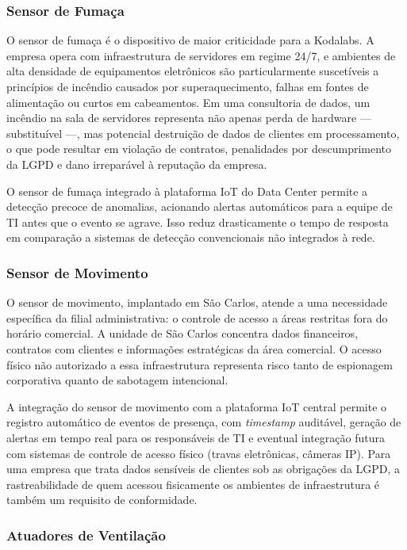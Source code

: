 \documentclass[12pt,a4paper]{article}
\begin{document}
\subsubsection{Sensor de Fumaça}

O sensor de fumaça é o dispositivo de maior criticidade para a Kodalabs. A empresa
opera com infraestrutura de servidores em regime 24/7, e ambientes de alta densidade
de equipamentos eletrônicos são particularmente suscetíveis a princípios de
incêndio causados por superaquecimento, falhas em fontes de alimentação ou curtos
em cabeamentos. Em uma consultoria de dados, um incêndio na sala de servidores
representa não apenas perda de hardware — substituível —, mas potencial destruição
de dados de clientes em processamento, o que pode resultar em violação de contratos,
penalidades por descumprimento da LGPD e dano irreparável à reputação da empresa.

O sensor de fumaça integrado à plataforma IoT do Data Center permite a detecção
precoce de anomalias, acionando alertas automáticos para a equipe de TI antes que
o evento se agrave. Isso reduz drasticamente o tempo de resposta em comparação a
sistemas de detecção convencionais não integrados à rede.

\subsubsection{Sensor de Movimento}

O sensor de movimento, implantado em São Carlos, atende a uma necessidade
específica da filial administrativa: o controle de acesso a áreas restritas fora
do horário comercial. A unidade de São Carlos concentra dados financeiros,
contratos com clientes e informações estratégicas da área comercial. O acesso
físico não autorizado a essa infraestrutura representa risco tanto de espionagem
corporativa quanto de sabotagem intencional.

A integração do sensor de movimento com a plataforma IoT central permite o registro
automático de eventos de presença, com \textit{timestamp} auditável, geração de
alertas em tempo real para os responsáveis de TI e eventual integração futura com
sistemas de controle de acesso físico (travas eletrônicas, câmeras IP). Para uma
empresa que trata dados sensíveis de clientes sob as obrigações da LGPD, a
rastreabilidade de quem acessou fisicamente os ambientes de infraestrutura é
também um requisito de conformidade.

\subsubsection{Atuadores de Ventilação}
\end{document}
